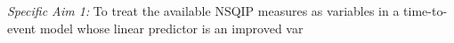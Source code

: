 \emph{Specific Aim 1:} To treat the available NSQIP measures as variables in a time-to-event model whose linear predictor is an improved var